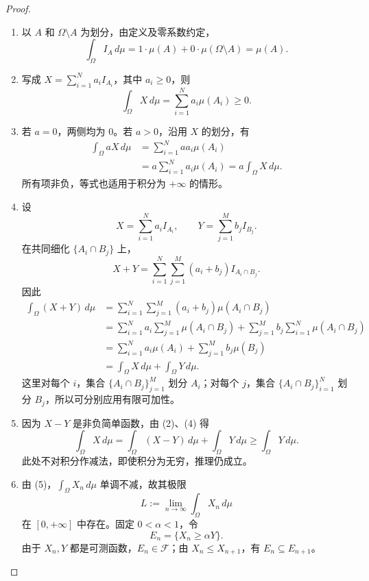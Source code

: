 \begin{proof}
\begin{enumerate}
\item 以 $A$ 和 $\Omega\setminus A$ 为划分，由定义及零系数约定，
\[
\int_\Omega I_A\,d\mu
=1\cdot\mu(A)+0\cdot\mu(\Omega\setminus A)=\mu(A).
\]
\item 写成 $X=\sum_{i=1}^N a_iI_{A_i}$，其中 $a_i\geq0$，则
\[
\int_\Omega X\,d\mu=\sum_{i=1}^N a_i\mu(A_i)\geq0.
\]
\item 若 $a=0$，两侧均为 $0$。若 $a>0$，沿用 $X$ 的划分，有
\begin{align*}
\int_\Omega aX\,d\mu
&=\sum_{i=1}^N aa_i\mu(A_i)\\
&=a\sum_{i=1}^N a_i\mu(A_i)
=a\int_\Omega X\,d\mu.
\end{align*}
所有项非负，等式也适用于积分为 $+\infty$ 的情形。
\item 设
\[
X=\sum_{i=1}^N a_iI_{A_i},\qquad
Y=\sum_{j=1}^M b_jI_{B_j}.
\]
在共同细化 $\{A_i\cap B_j\}$ 上，
\[
X+Y=\sum_{i=1}^N\sum_{j=1}^M(a_i+b_j)I_{A_i\cap B_j}.
\]
因此
\begin{align*}
\int_\Omega(X+Y)\,d\mu
&=\sum_{i=1}^N\sum_{j=1}^M(a_i+b_j)\mu(A_i\cap B_j)\\
&=\sum_{i=1}^N a_i\sum_{j=1}^M\mu(A_i\cap B_j)
 +\sum_{j=1}^M b_j\sum_{i=1}^N\mu(A_i\cap B_j)\\
&=\sum_{i=1}^N a_i\mu(A_i)+\sum_{j=1}^M b_j\mu(B_j)\\
&=\int_\Omega X\,d\mu+\int_\Omega Y\,d\mu.
\end{align*}
这里对每个 $i$，集合 $\{A_i\cap B_j\}_{j=1}^M$ 划分 $A_i$；对每个 $j$，集合 $\{A_i\cap B_j\}_{i=1}^N$ 划分 $B_j$，所以可分别应用有限可加性。
\item 因为 $X-Y$ 是非负简单函数，由 (2)、(4) 得
\[
\int_\Omega X\,d\mu
=\int_\Omega(X-Y)\,d\mu+\int_\Omega Y\,d\mu
\geq\int_\Omega Y\,d\mu.
\]
此处不对积分作减法，即使积分为无穷，推理仍成立。
\item 由 (5)，$\int_\Omega X_n\,d\mu$ 单调不减，故其极限
\[
L:=\lim_{n\to\infty}\int_\Omega X_n\,d\mu
\]
在 $[0,+\infty]$ 中存在。固定 $0<\alpha<1$，令
\[
E_n=\{X_n\geq\alpha Y\}.
\]
由于 $X_n,Y$ 都是可测函数，$E_n\in\mathcal F$；由 $X_n\leq X_{n+1}$，有 $E_n\subseteq E_{n+1}$。


\end{enumerate}
\end{proof}

